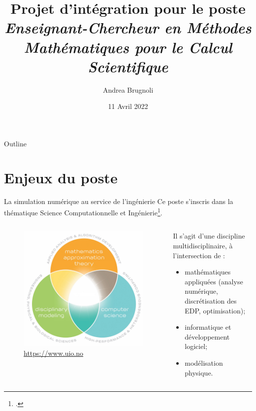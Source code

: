 \documentclass[aspectratio=169, french]{ISAE-Beamer}
\title[Projet d'intégration]{Projet d'intégration pour le poste\\ \small
\textit{Enseignant-Chercheur en Méthodes Mathématiques pour le Calcul Scientifique}}
\author[Andrea Brugnoli]{Andrea Brugnoli}
\date[11/4/22]{11 Avril 2022}
\begin{document}
	
	
	\maketitle
	
	
	\begin{frame}{Outline}
		
		\tableofcontents
		
	\end{frame}
	
	\section{Enjeux du poste}
	
	\begin{frame}{La simulation numérique au service de l'ingénierie}
		Ce poste s'inscris dans la thématique Science Computationnelle et Ingénierie\footcite{ulrich2018cse}.
		
		\begin{columns}
			\begin{column}{.45\textwidth}
			\begin{figure}
				\includegraphics[width=.8\textwidth]{cse.jpg}
				\caption{\href{https://www.uio.no/english/studies/programmes/computational-science-master/why-choose/}{https://www.uio.no}}
			\end{figure}	
			\end{column}
			\begin{column}{.5\textwidth}
			Il s'agit d'une discipline multidisciplinaire, à l'intersection de :
			\begin{itemize}
				\item mathématiques appliquées (analyse numérique, discrétisation des EDP, optimisation);
				\item informatique et développement logiciel;
				\item modélisation physique.
			\end{itemize}
			
			\end{column}
		\end{columns}	
		
	\end{frame}
\end{document}
